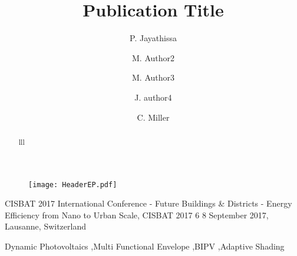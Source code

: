 \documentclass[preprint,11pt,3p]{elsarticle} %
\begin{document}
\begin{frontmatter}

\begin{figure}
\begin{center}
\texttt{[image: HeaderEP.pdf]}
\label{fig:header}
\end{center}
\end{figure}

\begin{center}
{CISBAT 2017 International Conference - Future Buildings \& Districts - Energy Efficiency from Nano to Urban Scale, CISBAT 2017 6 8 September 2017, Lausanne, Switzerland}
\end{center}

\title{Publication Title} 


\author[buds]{P. Jayathissa}
\address[buds]{Building and Urban Data Science Group,  Department of Building, Singapore} 

\author[buds]{M. Author2}


\author[buds]{M. Author3}

\author[buds]{J. author4}



\author[buds]{C. Miller  }




\begin{abstract}

lll

\end{abstract}

\begin{keyword}
Dynamic Photovoltaics \sep Multi Functional Envelope \sep BIPV \sep Adaptive Shading
\end{keyword}

\end{frontmatter}
\end{document}
